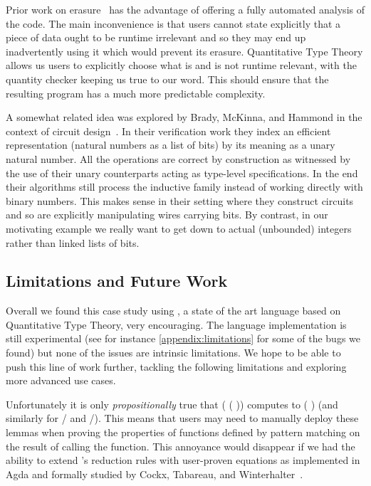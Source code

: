 Prior work on erasure~\cite{DBLP:journals/pacmpl/Tejiscak20} has the advantage of
offering a fully automated analysis of the code. The main inconvenience is that users
cannot state explicitly that a piece of data ought to be runtime irrelevant and so
they may end up inadvertently using it which would prevent its erasure.
%
Quantitative Type Theory allows us users to explicitly choose what is and is not
runtime relevant, with the quantity checker keeping us true to our word.
%
This should ensure that the resulting program has a much more predictable complexity.

A somewhat related idea was explored by Brady, McKinna, and Hammond in the context of
circuit design~\cite{DBLP:conf/sfp/BradyMH07}. In their verification work they index
an efficient representation (natural numbers as a list of bits) by its meaning as a
unary natural number. All the operations are correct by construction as witnessed by
the use of their unary counterparts acting as type-level specifications.
%
In the end their algorithms still process the inductive family instead of working
directly with binary numbers. This makes sense in their setting where they construct
circuits and so are explicitly manipulating wires carrying bits.
%
By contrast, in our motivating example we really want to get down to actual (unbounded)
integers rather than linked lists of bits.


\subsection{Limitations and Future Work}

Overall we found this case study using \idris{}, a state of the art language
based on Quantitative Type Theory, very encouraging.
%
The language implementation is still experimental (see for instance
\cref{appendix:limitations} for some of the bugs we found) but none of
the issues are intrinsic limitations.
%
We hope to be able to push this line of work further, tackling the following
limitations and exploring more advanced use cases.

Unfortunately it is only \emph{propositionally} true that
( (  ))
computes to (  ) (and similarly for
/ and /).
%
This means that users may need to manually deploy these lemmas when proving the
properties of functions defined by pattern matching on the result of calling the
 function.
%
This annoyance would disappear if we had the ability to extend \idris{}'s reduction rules
with user-proven equations as implemented in Agda and formally studied
by Cockx, Tabareau, and Winterhalter~\cite{DBLP:journals/pacmpl/CockxTW21}.

